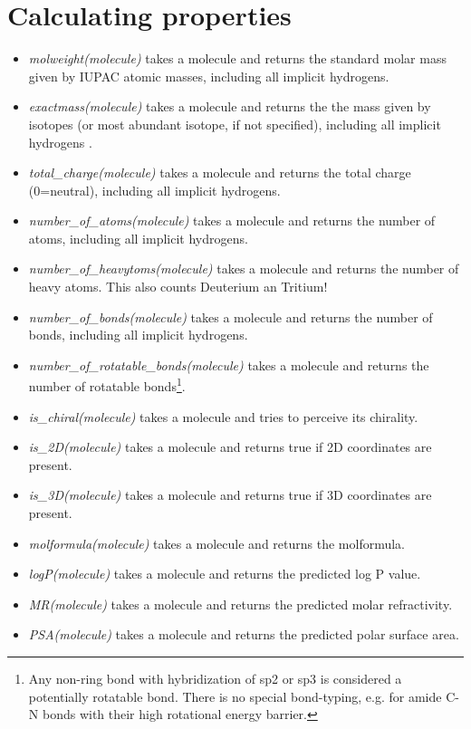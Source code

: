 \documentclass[a4paper]{article}
\begin{document}
\section{Calculating properties}
\begin{itemize}
\item\textit{molweight(molecule)} takes a molecule and returns the standard molar mass given by IUPAC atomic masses, including all implicit hydrogens.
\item\textit{exactmass(molecule)} takes a molecule and returns the the mass given by isotopes (or most abundant isotope, if not specified), including all implicit hydrogens .
\item\textit{total\_charge(molecule)} takes a molecule and returns the total charge (0=neutral), including all implicit hydrogens.
\item\textit{number\_of\_atoms(molecule)} takes a molecule and returns the number of atoms, including all implicit hydrogens.
\item\textit{number\_of\_heavytoms(molecule)} takes a molecule and returns the number of heavy atoms. This also counts Deuterium an Tritium!
\item\textit{number\_of\_bonds(molecule)} takes a molecule and returns the number of bonds, including all implicit hydrogens.
\item\textit{number\_of\_rotatable\_bonds(molecule)} takes a molecule and returns the number of rotatable bonds\footnote{Any non-ring bond with hybridization of sp2 or sp3 is considered a potentially rotatable bond. There is no special bond-typing, e.g. for amide C-N bonds with their high rotational energy barrier.}.
\item\textit{is\_chiral(molecule)} takes a molecule and tries to perceive its chirality.
\item\textit{is\_2D(molecule)} takes a molecule and returns true if 2D coordinates are present.
\item\textit{is\_3D(molecule)} takes a molecule and returns true if 3D coordinates are present.
\item\textit{molformula(molecule)} takes a molecule and returns the molformula.
\item\textit{logP(molecule)} takes a molecule and returns the predicted log P value.
\item\textit{MR(molecule)} takes a molecule and returns the predicted molar refractivity.
\item\textit{PSA(molecule)} takes a molecule and returns the predicted polar surface area.
\end{itemize}
\end{document}
